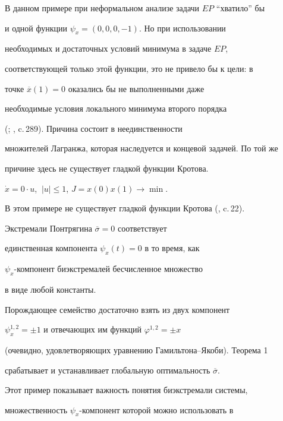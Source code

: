 В данном примере при неформальном анализе задачи $EP$ ``хватило'' бы


и одной функции $ \psi_x =(0,0,0,-1)$. Но при использовании


необходимых и достаточных условий минимума в задаче $EP$,


соответствующей только этой функции, это не привело бы к цели: в


точке $\overline{x}(1)=0$ оказались бы не выполненными даже


необходимые условия локального минимума второго порядка


(\cite{16}; \cite{17}, c.\,289). Причина состоит в неединственности


множителей Лагранжа, которая наследуется и концевой задачей. По той же


причине здесь не существует гладкой функции Кротова.





\begin{exam}


$\Dot{x}=0\cdot u$, $~|u|\leq 1$, $J=x(0)x(1)\rightarrow\min $.


\end{exam}





В этом примере не существует гладкой функции Кротова (\cite{10}, c.\,22).


Экстремали Понтрягина $\overline{\sigma}=0$ соответствует


единственная компонента $\psi_x (t)=0$ в то время, как


$\psi_x$-компонент биэкстремалей бесчисленное множество


в виде любой константы.


Порождающее семейство достаточно взять из двух компонент


$\psi_x^{1,2}=\pm 1$ и отвечающих им функций $\varphi^{1,2}=\pm x$


(очевидно, удовлетворяющих уравнению Гамильтона--Якоби). Теорема 1


срабатывает и устанавливает глобальную оптимальность $\overline{\sigma}$.





Этот пример показывает важность понятия биэкстремали системы,


множественность \linebreak $\psi_x $-компонент которой можно использовать в


